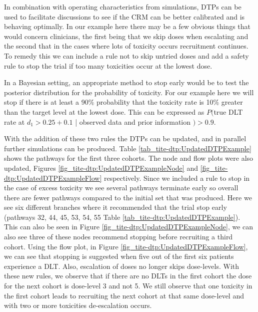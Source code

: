 In combination with operating characteristics from simulations, DTPs can be used to facilitate discussions to see if the CRM can be better calibrated and is behaving optimally. In our example here there may be a few obvious things that would concern clinicians, the first being that we skip doses when escalating and the second that in the cases where lots of toxicity occurs recruitment continues. To remedy this we can include a rule not to skip untried doses and add a safety rule to stop the trial if too many toxicities occur at the lowest dose. 

In a Bayesian setting, an appropriate method to stop early would be to test the posterior distribution for the probability of toxicity. For our example here we will stop if there is at least a 90\% probability that the toxicity rate is 10\% greater than the target level at the lowest dose. This can be expressed as $P($true DLT rate at $d_1 > 0.25 + 0.1$ | observed data and prior information $) > 0.9$. 

With the addition of these two rules the DTPs can be updated, and in parallel further simulations can be produced. Table \ref{tab_tite-dtp:UpdatedDTPExample} shows the pathways for the first three cohorts. The node and flow plots were also updated, Figures \ref{fig_tite-dtp:UpdatedDTPExampleNode} and \ref{fig_tite-dtp:UpdatedDTPExampleFlow} respectively. Since we included a rule to stop in the case of excess toxicity we see several pathways terminate early so overall there are fewer pathways compared to the initial set that was produced. Here we see six different branches where it recommended that the trial stop early (pathways 32, 44, 45, 53, 54, 55 Table \ref{tab_tite-dtp:UpdatedDTPExample}). This can also be seen in Figure \ref{fig_tite-dtp:UpdatedDTPExampleNode}, we can also see three of these nodes recommend stopping before recruiting a third cohort. Using the flow plot, in Figure \ref{fig_tite-dtp:UpdatedDTPExampleFlow}, we can see that stopping is suggested when five out of the first six patients experience a DLT. Also, escalation of doses no longer skips dose-levels. With these new rules, we observe that if there are no DLTs in the first cohort the dose for the next cohort is dose-level 3 and not 5. We still observe that one toxicity in the first cohort leads to recruiting the next cohort at that same dose-level and with two or more toxicities de-escalation occurs. 

